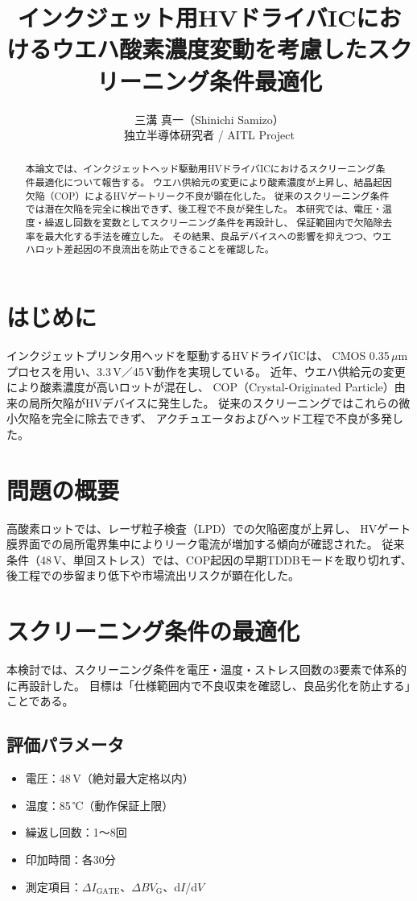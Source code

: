\documentclass[twocolumn]{ieeetran}
\title{インクジェット用HVドライバICにおけるウエハ酸素濃度変動を考慮したスクリーニング条件最適化}
\author{三溝 真一（Shinichi Samizo）\\
独立半導体研究者 / AITL Project}
\date{}
\begin{document}
\maketitle

\begin{abstract}
本論文では、インクジェットヘッド駆動用HVドライバICにおけるスクリーニング条件最適化について報告する。
ウエハ供給元の変更により酸素濃度が上昇し、結晶起因欠陥（COP）によるHVゲートリーク不良が顕在化した。
従来のスクリーニング条件では潜在欠陥を完全に検出できず、後工程で不良が発生した。
本研究では、電圧・温度・繰返し回数を変数としてスクリーニング条件を再設計し、
保証範囲内で欠陥除去率を最大化する手法を確立した。
その結果、良品デバイスへの影響を抑えつつ、ウエハロット差起因の不良流出を防止できることを確認した。
\end{abstract}

\section{はじめに}
インクジェットプリンタ用ヘッドを駆動するHVドライバICは、
CMOS 0.35\,$\mu$mプロセスを用い、3.3\,V／45\,V動作を実現している。
近年、ウエハ供給元の変更により酸素濃度が高いロットが混在し、
COP（Crystal-Originated Particle）由来の局所欠陥がHVデバイスに発生した。
従来のスクリーニングではこれらの微小欠陥を完全に除去できず、
アクチュエータおよびヘッド工程で不良が多発した。

\section{問題の概要}
高酸素ロットでは、レーザ粒子検査（LPD）での欠陥密度が上昇し、
HVゲート膜界面での局所電界集中によりリーク電流が増加する傾向が確認された。
従来条件（48\,V、単回ストレス）では、COP起因の早期TDDBモードを取り切れず、
後工程での歩留まり低下や市場流出リスクが顕在化した。

\section{スクリーニング条件の最適化}
本検討では、スクリーニング条件を電圧・温度・ストレス回数の3要素で体系的に再設計した。
目標は「仕様範囲内で不良収束を確認し、良品劣化を防止する」ことである。

\subsection{評価パラメータ}
\begin{itemize}
\item 電圧：48\,V（絶対最大定格以内）
\item 温度：85\,℃（動作保証上限）
\item 繰返し回数：1～8回
\item 印加時間：各30分
\item 測定項目：$\Delta I_\mathrm{GATE}$、$\Delta BV_\mathrm{G}$、d$I$/d$V$
\end{itemize}
\end{document}
